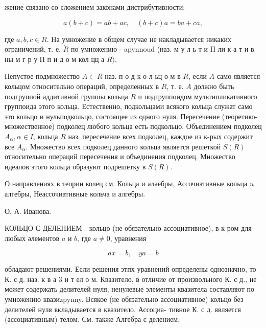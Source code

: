 \documentclass[10pt]{article}
\begin{document}
жение связано со сложением законами дистрибутивности:



\[

a(b+c)=a b+a c, \quad(b+c) a=b a+c a,

\]



где $a, b, c \in R$. На умножение в общем случае не накладывается никаких ограничений, т. е. $\dot{R}$ по умножению - apynnoud (наз. м у л ь т и П ли к а т и в ны м г р у П п и д о м кол цц а $R)$.



Непустое подмножество $A \subset R$ наз. п о д к о л ьц о м в $R$, если $A$ само является кольцом относительно операций, определенных в $R$, т. е. $A$ должно быть подгруппой аддитивной групшы кольца $R$ и подгруппоидом мультипликативного группоида этого кольца. Естественно, подкольцами всякого кольца служат само это кольцо и нульподкольцо, состоящее из одного нуля. Пересечение (теоретико-множественное) подколец любого кольца есть подкольцо. Объединением подколец $A_{\alpha}, \alpha \in I$, кольца $R$ наз. пересечение всех подколец, каждое из к-рых содержит все $A_{\alpha}$. Множество всех подколец данного кольца является решеткой $S(R)$ относительно операций пересечения и объединения подколец. Множество идеалов этого кольца образуют подрешетку в $S(R)$.



О направлениях в теории колец см. Кольца и аләебры, Ассочиативные кольца $u$ алгебры, Неассочиативные кольча и алгебры.



О. А. Иванова.



КОЛЬЦО С ДЕЛЕНИЕМ - кольцо (не обязательно ассоциативное), в к-ром для любых әлементов $a$ и $b$, где $a \neq 0$, уравнения



\[

a x=b, \quad y a=b

\]



обладают решениями. Если решения этпх уравнений определены однозначно, то К. с д. наз. к в а 3 и т ел о м. Квазитело, в отличие от произвольного К. с д., не может содержать делителей нуля; ненулевые элементы квазитела составляют по умножению квазиzpynny. Всякое (не обязательно ассоциативное) кольцо без делителей нуля вкладывается в квазитело. Ассоциа- тивное К. с д. является (ассоциативным) телом. См. также Алгебра с делением.
\end{document}
